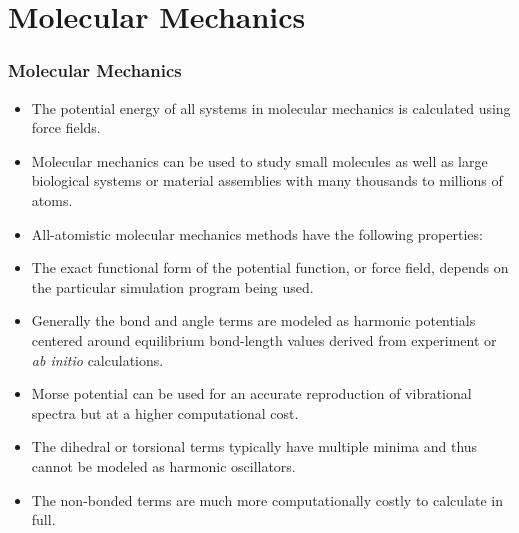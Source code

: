 \documentclass[slidestop,mathserif,compress,xcolor=svgnames]{beamer}
\begin{document}
\section{Molecular Mechanics}
\begin{frame}[allowframebreaks]
\frametitle{\small Molecular Mechanics}
\footnotesize{
\begin{itemize}
\item The potential energy of all systems in molecular mechanics is calculated using force fields. 
\item Molecular mechanics can be used to study small molecules as well as large biological systems or material assemblies with many thousands to millions of atoms.
\item All-atomistic molecular mechanics methods have the following properties:
\item The exact functional form of the potential function, or force field, depends on the particular simulation program being used. 
\item Generally the bond and angle terms are modeled as harmonic potentials centered around equilibrium bond-length values derived from experiment or \emph{ab initio} calculations. 
\item Morse potential can be used for an accurate reproduction of vibrational spectra but at a higher computational cost.
\item The dihedral or torsional terms  typically have multiple minima and thus cannot be modeled as harmonic oscillators.
\item The non-bonded terms are much more computationally costly to calculate in full.%

\end{itemize}}
\end{frame}
\end{document}
